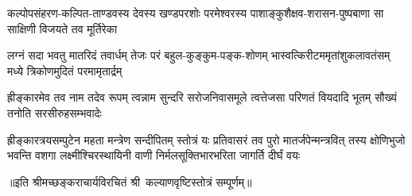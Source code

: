 \fourlineindentedshloka
{कल्पोपसंहरण-कल्पित-ताण्डवस्य}
{देवस्य खण्डपरशोः परमेश्वरस्य}
{पाशाङ्कुशैक्षव-शरासन-पुष्पबाणा}
{सा साक्षिणी विजयते तव मूर्तिरेका}%

\fourlineindentedshloka
{लग्नं सदा भवतु मातरिदं तवार्धम्}
{तेजः परं बहुल-कुङ्कुम-पङ्क-शोणम्}
{भास्वत्किरीटममृतांशुकलावतंसम्}
{मध्ये त्रिकोणमुदितं परमामृतार्द्रम्}%

\fourlineindentedshloka
{ह्रीङ्कारमेव तव नाम तदेव रूपम्}
{त्वन्नाम सुन्दरि सरोजनिवासमूले}
{त्वत्तेजसा परिणतं वियदादि भूतम्}
{सौख्यं तनोति सरसीरुहसम्भवादेः}%

\fourlineindentedshloka
{ह्रीङ्कारत्रयसम्पुटेन महता मन्त्रेण सन्दीपितम्}
{स्तोत्रं यः प्रतिवासरं तव पुरो मातर्जपेन्मन्त्रवित्}
{तस्य क्षोणिभुजो भवन्ति वशगा लक्ष्मीश्चिरस्थायिनी}
{वाणी निर्मलसूक्तिभारभरिता जागर्ति दीर्घं वयः}%
 
॥इति श्रीमच्छङ्कराचार्यविरचितं श्री~कल्याणवृष्टिस्तोत्रं  सम्पूर्णम्॥